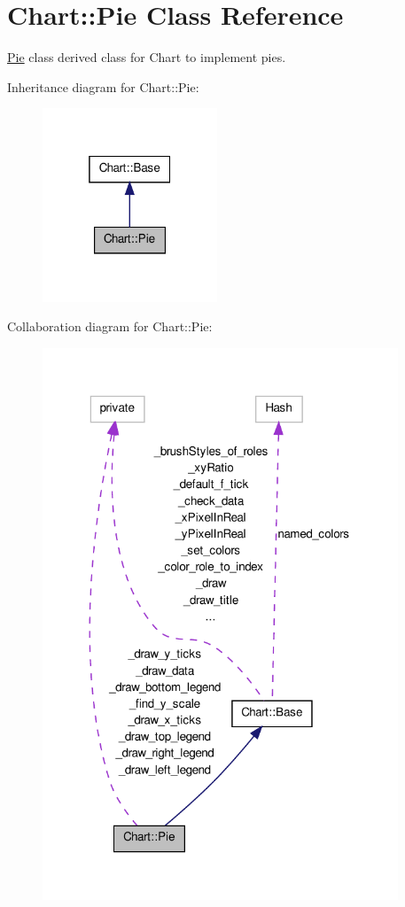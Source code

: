 \hypertarget{classChart_1_1Pie}{
\section{Chart::Pie Class Reference}
\label{classChart_1_1Pie}
}


\hyperlink{classChart_1_1Pie}{Pie} class derived class for Chart to implement pies.  




Inheritance diagram for Chart::Pie:\nopagebreak
\begin{figure}[H]
\begin{center}
\leavevmode
\includegraphics[width=148pt]{classChart_1_1Pie__inherit__graph}
\end{center}
\end{figure}


Collaboration diagram for Chart::Pie:\nopagebreak
\begin{figure}[H]
\begin{center}
\leavevmode
\includegraphics[width=301pt]{classChart_1_1Pie__coll__graph}
\end{center}
\end{figure}
